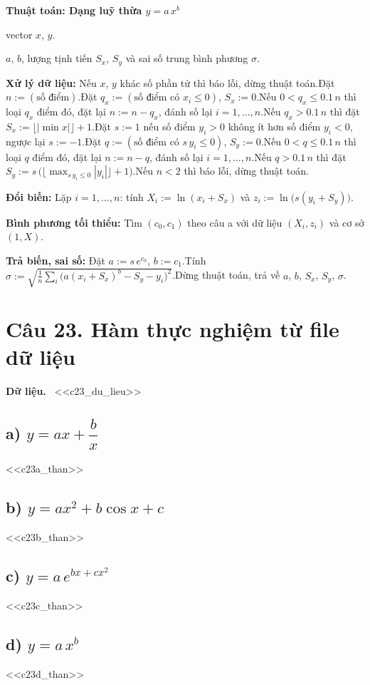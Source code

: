\documentclass[11pt,a4paper]{article}
\newenvironment{thuattoan}[1]
  {\par\medskip\noindent\textbf{Thuật toán: #1}\begin{description}[style=standard,align=left,leftmargin=4.3em,labelwidth=3.9em,labelsep=0.4em,itemsep=1pt,topsep=3pt,font=\normalfont\bfseries]}
  {\end{description}}
\newcommand{\pp}[1]{\par\smallskip\noindent\textbf{#1}\ }
\begin{document}
\begin{thuattoan}{Dạng luỹ thừa $y=a\,x^b$}
\item[Input:] vector $x$, $y$.
\item[Output:] $a$, $b$, lượng tịnh tiến $S_x$, $S_y$ và sai số trung bình phương $\sigma$.
\item[Bước 0:] \textbf{Xử lý dữ liệu:} Nếu $x$, $y$ khác số phần tử thì báo lỗi, dừng thuật toán.\newline Đặt $n:=(\text{số điểm})$.\newline Đặt $q_x:=(\text{số điểm có }x_i\le0)$, $S_x:=0$.\newline Nếu $0<q_x\le0.1\,n$ thì loại $q_x$ điểm đó, đặt lại $n:=n-q_x$, đánh số lại $i=1,\dots,n$.\newline Nếu $q_x>0.1\,n$ thì đặt $S_x:=\lfloor|\min x|\rfloor+1$.\newline Đặt $s:=1$ nếu số điểm $y_i>0$ không ít hơn số điểm $y_i<0$, ngược lại $s:=-1$.\newline Đặt $q:=(\text{số điểm có }s\,y_i\le0)$, $S_y:=0$.\newline Nếu $0<q\le0.1\,n$ thì loại $q$ điểm đó, đặt lại $n:=n-q$, đánh số lại $i=1,\dots,n$.\newline Nếu $q>0.1\,n$ thì đặt $S_y:=s\,\big(\lfloor\max_{s\,y_i\le0}|y_i|\rfloor+1\big)$.\newline Nếu $n<2$ thì báo lỗi, dừng thuật toán.
\item[Bước 1:] \textbf{Đổi biến:} Lặp $i=1,\dots,n$: tính $X_i:=\ln(x_i+S_x)$ và $z_i:=\ln\big(s(y_i+S_y)\big)$.
\item[Bước 2:] \textbf{Bình phương tối thiểu:} Tìm $(c_0,c_1)$ theo câu a với dữ liệu $(X_i,z_i)$ và cơ sở $(1,X)$.
\item[Bước 3:] \textbf{Trả biến, sai số:} Đặt $a:=s\,e^{c_0}$, $b:=c_1$.\newline Tính $\sigma:=\sqrt{\frac1n\sum_i\big(a(x_i+S_x)^b-S_y-y_i\big)^2}$.\newline Dừng thuật toán, trả về $a$, $b$, $S_x$, $S_y$, $\sigma$.
\end{thuattoan}

\section{Câu 23. Hàm thực nghiệm từ file dữ liệu}

\pp{Dữ liệu.} <<c23_du_lieu>>

\subsection{a) $y=ax+\dfrac bx$}
<<c23a_than>>

\subsection{b) $y=ax^2+b\cos x+c$}
<<c23b_than>>

\subsection{c) $y=a\,e^{bx+cx^2}$}
<<c23c_than>>

\subsection{d) $y=a\,x^b$}
<<c23d_than>>
\end{document}
